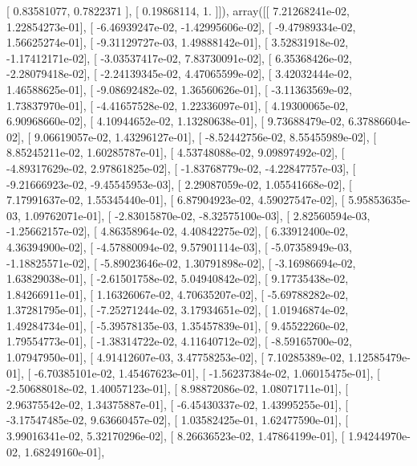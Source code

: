 \documentclass{article}
\begin{document}
       [ 0.83581077,  0.7822371 ],
       [ 0.19868114,  1.        ]]), array([[  7.21268241e-02,   1.22854273e-01],
       [ -6.46939247e-02,  -1.42995606e-02],
       [ -9.47989334e-02,   1.56625274e-01],
       [ -9.31129727e-03,   1.49888142e-01],
       [  3.52831918e-02,  -1.17412171e-02],
       [ -3.03537417e-02,   7.83730091e-02],
       [  6.35368426e-02,  -2.28079418e-02],
       [ -2.24139345e-02,   4.47065599e-02],
       [  3.42032444e-02,   1.46588625e-01],
       [ -9.08692482e-02,   1.36560626e-01],
       [ -3.11363569e-02,   1.73837970e-01],
       [ -4.41657528e-02,   1.22336097e-01],
       [  4.19300065e-02,   6.90968660e-02],
       [  4.10944652e-02,   1.13280638e-01],
       [  9.73688479e-02,   6.37886604e-02],
       [  9.06619057e-02,   1.43296127e-01],
       [ -8.52442756e-02,   8.55455989e-02],
       [  8.85245211e-02,   1.60285787e-01],
       [  4.53748088e-02,   9.09897492e-02],
       [ -4.89317629e-02,   2.97861825e-02],
       [ -1.83768779e-02,  -4.22847757e-03],
       [ -9.21666923e-02,  -9.45545953e-03],
       [  2.29087059e-02,   1.05541668e-02],
       [  7.17991637e-02,   1.55345440e-01],
       [  6.87904923e-02,   4.59027547e-02],
       [  5.95853635e-03,   1.09762071e-01],
       [ -2.83015870e-02,  -8.32575100e-03],
       [  2.82560594e-03,  -1.25662157e-02],
       [  4.86358964e-02,   4.40842275e-02],
       [  6.33912400e-02,   4.36394900e-02],
       [ -4.57880094e-02,   9.57901114e-03],
       [ -5.07358949e-03,  -1.18825571e-02],
       [ -5.89023646e-02,   1.30791898e-02],
       [ -3.16986694e-02,   1.63829038e-01],
       [ -2.61501758e-02,   5.04940842e-02],
       [  9.17735438e-02,   1.84266911e-01],
       [  1.16326067e-02,   4.70635207e-02],
       [ -5.69788282e-02,   1.37281795e-01],
       [ -7.25271244e-02,   3.17934651e-02],
       [  1.01946874e-02,   1.49284734e-01],
       [ -5.39578135e-03,   1.35457839e-01],
       [  9.45522260e-02,   1.79554773e-01],
       [ -1.38314722e-02,   4.11640712e-02],
       [ -8.59165700e-02,   1.07947950e-01],
       [  4.91412607e-03,   3.47758253e-02],
       [  7.10285389e-02,   1.12585479e-01],
       [ -6.70385101e-02,   1.45467623e-01],
       [ -1.56237384e-02,   1.06015475e-01],
       [ -2.50688018e-02,   1.40057123e-01],
       [  8.98872086e-02,   1.08071711e-01],
       [  2.96375542e-02,   1.34375887e-01],
       [ -6.45430337e-02,   1.43995255e-01],
       [ -3.17547485e-02,   9.63660457e-02],
       [  1.03582425e-01,   1.62477590e-01],
       [  3.99016341e-02,   5.32170296e-02],
       [  8.26636523e-02,   1.47864199e-01],
       [  1.94244970e-02,   1.68249160e-01],
\end{document}
